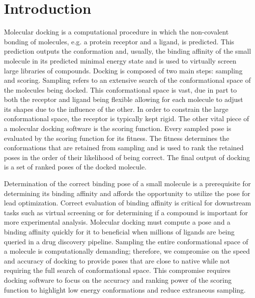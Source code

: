 \documentclass[journal=jcisd8,manuscript=article]{achemso}
\begin{document}
\section{Introduction}

Molecular docking is a computational procedure in which the non-covalent bonding of molecules, e.g. a protein receptor and a ligand, is predicted. This prediction outputs the conformation and, usually, the binding affinity of the small molecule in its predicted minimal energy state and is used to virtually screen large libraries of compounds\cite{kitchen2004docking,leach2006prediction,lyu2019ultra}. Docking is composed of two main steps: sampling and scoring. Sampling refers to an extensive search of the conformational space of the molecules being docked. This conformational space is vast, due in part to both the receptor and ligand being flexible allowing for each molecule to adjust its shapes due to the influence of the other. In order to constrain the large conformational space, the receptor is typically kept rigid. The other vital piece of a molecular docking software is the scoring function. Every sampled pose is evaluated by the scoring function for its fitness. The fitness determines the conformations that are retained from sampling and is used to rank the retained poses in the order of their likelihood of being correct. The final output of docking is a set of ranked poses of the docked molecule. 

Determination of the correct binding pose of a small molecule is a prerequisite for determining its binding affinity and affords the opportunity to utilize the pose for lead optimization. Correct evaluation of binding affinity is critical for downstream tasks such as virtual screening or for determining if a compound is important for more experimental analysis. Molecular docking must compute a pose and a binding affinity quickly for it to beneficial when millions of ligands are being queried in a drug discovery pipeline\cite{kitchen2004docking}. Sampling the entire conformational space of a molecule is computationally demanding; therefore, we compromise on the speed and accuracy of docking to provide poses that are close to native while not requiring the full search of conformational space. This compromise requires docking software to focus on the accuracy and ranking power of the scoring function to highlight low energy conformations and reduce extraneous sampling.
\end{document}
